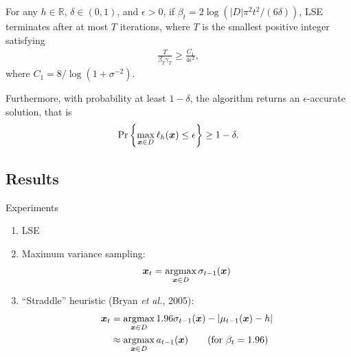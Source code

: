 \documentclass[10pt,mathserif,serif]{beamer}
\newcommand{\acl}{\textsf{LSE}\xspace}
\begin{document}
\begin{frame}
\end{frame}

\begin{frame}
\begin{theorem}[Convergence of \acl]
\label{thm:acl}
For any $h\in\mathbb{R}$, $\delta \in (0, 1)$, and $\epsilon > 0$,
if $\beta_t = 2\log(|D|\pi^2 t^2/(6\delta))$, \acl terminates after
at most $T$ iterations, where $T$ is the smallest positive integer
satisfying
\begin{align*}
\frac{T}{\beta_T \gamma_T} \geq \frac{C_1}{4\epsilon^2},
\end{align*}
where $C_1 = 8 / \log(1 + \sigma^{-2})$.

Furthermore, with probability at least $1-\delta$, the algorithm returns
an $\epsilon$-accurate solution, that is
\begin{align*}
\Pr\left\{\max_{\bm{x}\in D}\ell_h(\bm{x}) \leq \epsilon\right\} \geq 1 - \delta.
\end{align*}
\end{theorem}
\end{frame}

\subsection*{Results}
\begin{frame}
\begin{center}
{\large Experiments}
\end{center}
\begin{enumerate}
\item \acl
\item<2-> Maximum variance sampling:
\vspace{-0.5em}
\begin{align*}
\*x_t = \argmax_{\*x\in D} \sigma_{t-1}(\*x)
\end{align*}
\item<3-> ``Straddle'' heuristic (Bryan \emph{et al.}, 2005):
\vspace{-0.5em}
\begin{align*}
\*x_t &= \argmax_{\*x\in D} 1.96\sigma_{t-1}(\*x)-|\mu_{t-1}(\*x) - h|\\
&\approx \argmax_{\*x\in D} a_{t-1}(\*x) \tag{for $\beta_t = 1.96$}
\end{align*}
\end{enumerate}
\end{frame}
\end{document}
